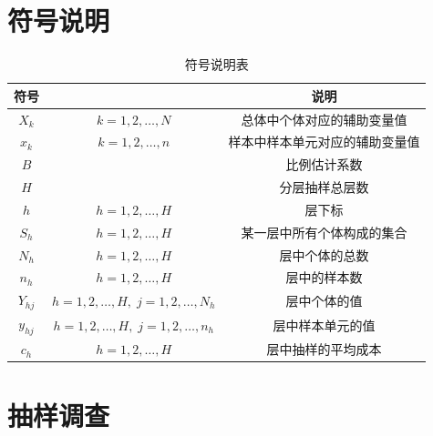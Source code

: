
\chapter*{符号说明} %
\begin{table}[h]
	\centering
	\setlength{\tabcolsep}{25pt} %
	\begin{tabular}{ccc}
		\toprule
		符号    &  & 说明 \\
		\midrule
		$X_k$		& $k=1,2,\dots,N$      & 总体中个体对应的辅助变量值 \\
		$x_k$		& $k=1,2,\dots,n$      & 样本中样本单元对应的辅助变量值 \\
		$B$         &                      & 比例估计系数 \\
		$H$		    &                      & 分层抽样总层数 \\
		$h$         & $h=1,2,\dots,H$      & 层下标 \\
		$S_h$       & $h=1,2,\dots,H$      & 某一层中所有个体构成的集合 \\
		$N_h$		& $h=1,2,\dots,H$	   & 层中个体的总数 \\
		$n_h$		& $h=1,2,\dots,H$	   & 层中的样本数 \\
		$Y_{hj}$    & $h=1,2,\dots,H,\;j=1,2,\dots,N_h$ & 层中个体的值 \\
		$y_{hj}$    & $h=1,2,\dots,H,\;j=1,2,\dots,n_h$ & 层中样本单元的值 \\
		$c_h$       & $h=1,2,\dots,H$      & 层中抽样的平均成本 \\
		\bottomrule
	\end{tabular}
	\caption{符号说明表}
\end{table}

\chapter{抽样调查}

